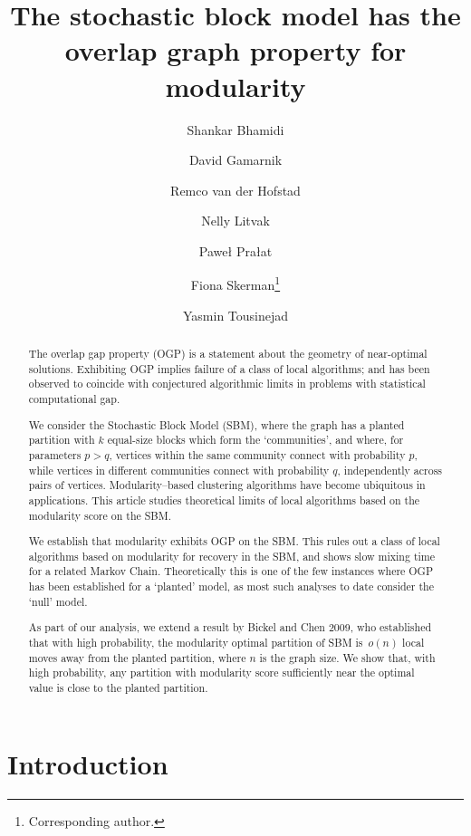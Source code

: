 \documentclass[a4paper,UKenglish,cleveref, autoref, thm-restate,numberwithinsect]{lipics-v2021}
\title{The stochastic block model has the overlap graph property for modularity}
\author{Shankar Bhamidi}{Department of Statistics and Operations Research, University of North Carolina, Chapel Hill, USA.}{bhamidi@email.unc.edu}{0009-0000-3953-936X}{Bhamidi was partially supported by NSF DMS-2113662, DMS-2413928, DMS-2434559 and NSF RTG grant DMS-2134107.}
\author{David Gamarnik}{MIT Sloan School of Management.}{gamarnik@mit.edu}{0000-0001-8898-8778}{Gamarnik partially supported by NSF Grant CISE 2233897.}
\author{Remco van der Hofstad}{Department of Mathematics and Computer Science, Eindhoven University of Technology, 
The Netherlands.}{rhofstad@win.tue.nl}{0000-0003-1331-9697}{Partially supported by the Netherlands Organisation for Scientific Research (NWO) through the Gravitation NETWORKS grant 024.002.003.}
\author{Nelly Litvak}{Department of Mathematics and Computer Science, Eindhoven University of Technology, 
The Netherlands.}{n.v.litvak@tue.nl}{0000-0002-6750-3484}{Partially supported by the Netherlands Organisation for Scientific Research (NWO) through the Gravitation NETWORKS grant 024.002.003.}
\author{Pawe{\l} Pra{\l}at} {Department of Mathematics, Toronto Metropolitan University, %
Canada.} {pralat@torontomu.ca}{0000-0001-9176-8493}{Partially supported by NSERC Discovery Grant.}
\author{Fiona Skerman\footnote{Corresponding author.}}{Department of Mathematics, Uppsala University, Sweden.}{fiona.skerman@math.uu.se}{0000-0003-4141-7059}{Partially supported by the Wallenberg AI, Autonomous Systems and Software Program (WASP) funded by the Knut and Alice Wallenberg Foundation.}
\author{Yasmin Tousinejad}{Department of Mathematics, Uppsala University, 
Sweden.}{yasmin.tousinejad@math.uu.se}{0000-0002-6860-9985}{Partially supported by the Wallenberg AI, Autonomous Systems and Software Program (WASP) funded by the Knut and Alice Wallenberg Foundation.}
\begin{document}
\maketitle



\begin{abstract}

    The overlap gap property (OGP) is a statement about the geometry of near-optimal solutions. Exhibiting OGP implies failure of a class of local algorithms; and has been observed to coincide with conjectured algorithmic limits in problems with statistical computational gap. 

    
    We consider the Stochastic Block Model (SBM), where the graph has a planted partition with $k$ equal-size blocks which form the `communities', and where, for parameters $p>q$, vertices within the same community connect with probability $p$, while vertices in different communities connect with probability $q$, independently across pairs of vertices. Modularity--based clustering algorithms have become ubiquitous in applications. This article studies theoretical limits of local algorithms based on the modularity score on the SBM. 

    We establish that modularity exhibits OGP on the SBM. This rules out a class of local algorithms based on modularity for recovery in the SBM, and shows slow mixing time for a related Markov Chain.  Theoretically this is one of the few instances where OGP has been established for a `planted' model, as most such analyses to date consider the `null' model.

    As part of our analysis, we extend a result by Bickel and Chen 2009, who established that with high probability, the modularity optimal partition of SBM is~$o(n)$ local moves away from the planted partition, where $n$ is the graph size. We show that, with high probability, any partition with modularity score sufficiently near the optimal value is close to the planted partition. 
\end{abstract}



\section{Introduction}
\end{document}

